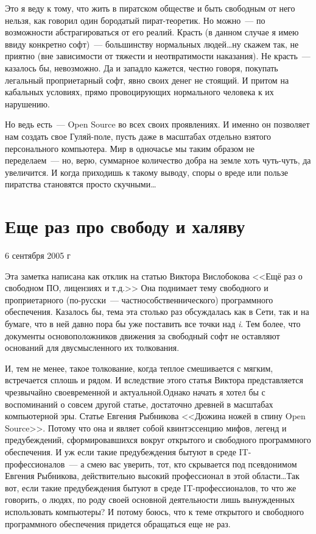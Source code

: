 Это я веду к тому, что жить в пиратском обществе и быть свободным от него нельзя, как говорил один бородатый пират-теоретик. Но можно~--- по возможности абстрагироваться от его реалий. Красть (в данном случае я имею ввиду конкретно софт)~--- большинству нормальных людей\dots ну скажем так, не приятно (вне зависимости от тяжести и неотвратимости наказания). Не красть~--- казалось бы, невозможно. Да и западло кажется, честно говоря, покупать легальный проприетарный софт, явно своих денег не стоящий. И притом на кабальных условиях, прямо провоцирующих нормального человека к их нарушению.

Но ведь есть~--- Open Source во всех своих проявлениях. И именно он позволяет нам создать свое Гуляй-поле, пусть даже в масштабах отдельно взятого персонального компьютера. Мир в одночасье мы таким образом не переделаем~--- но, верю, суммарное количество добра на земле хоть чуть-чуть, да увеличится. И когда приходишь к такому выводу, споры о вреде или пользе пиратства становятся просто скучными\dots

\section{Еще раз про свободу и халяву} 
\begin{timeline}6 сентября 2005 г\end{timeline}
Эта заметка написана как отклик на статью Виктора Вислобокова <<Ещё раз о свободном ПО, лицензиях и т.д.>> Она поднимает тему свободного и проприетарного (по-русски~--- частнособственнического) программного обеспечения. Казалось бы, тема эта столько раз обсуждалась как в Сети, так и на бумаге, что в ней давно пора бы уже поставить все точки над \textit{i}. Тем более, что документы основоположников движения за свободный софт не оставляют оснований для двусмысленного их толкования.

И, тем не менее, такое толкование, когда теплое смешивается с мягким, встречается сплошь и рядом. И вследствие этого статья Виктора представляется чрезвычайно своевременной и актуальной.Однако начать я хотел бы с воспоминаний о совсем другой статье, достаточно древней в масштабах компьютерной эры. Статье Евгения Рыбникова <<Дюжина ножей в спину Open Source>>. Потому что она и являет собой квинтэссенцию мифов, легенд и предубеждений, сформировавшихся вокруг открытого и свободного программного обеспечения. И уж если такие предубеждения бытуют в среде IT-профессионалов~--- а смею вас уверить, тот, кто скрывается под псевдонимом Евгения Рыбникова, действительно высокий профессионал в этой области\dots Так вот, если такие предубеждения бытуют в среде IT-профессионалов, то что же говорить, о людях, по роду своей основной деятельности лишь вынужденных использовать компьютеры? И потому боюсь, что к теме открытого и свободного программного обеспечения придется обращаться еще не раз.

